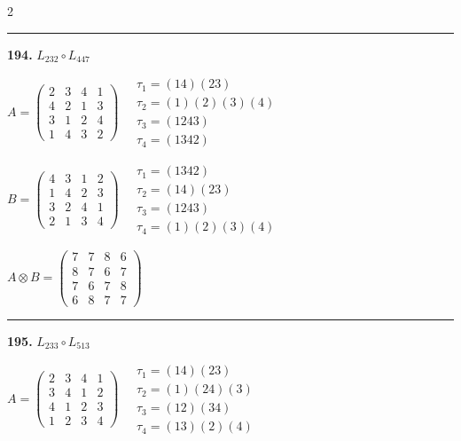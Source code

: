 \begin{multicols}{2}
\vspace{0.3em}
\hrule
\vspace{0.3em}

\noindent\textbf{194.} $L_{232} \circ L_{447}$

$A = \begin{pmatrix} 2 & 3 & 4 & 1 \\ 4 & 2 & 1 & 3 \\ 3 & 1 & 2 & 4 \\ 1 & 4 & 3 & 2 \end{pmatrix} \quad \begin{matrix} \tau_{1}=(1 4)(2 3) \\ \tau_{2}=(1)(2)(3)(4) \\ \tau_{3}=(1 2 4 3) \\ \tau_{4}=(1 3 4 2) \end{matrix}$

$B = \begin{pmatrix} 4 & 3 & 1 & 2 \\ 1 & 4 & 2 & 3 \\ 3 & 2 & 4 & 1 \\ 2 & 1 & 3 & 4 \end{pmatrix} \quad \begin{matrix} \tau_{1}=(1 3 4 2) \\ \tau_{2}=(1 4)(2 3) \\ \tau_{3}=(1 2 4 3) \\ \tau_{4}=(1)(2)(3)(4) \end{matrix}$

$A \otimes B = \begin{pmatrix} 7 & 7 & 8 & 6 \\ 8 & 7 & 6 & 7 \\ 7 & 6 & 7 & 8 \\ 6 & 8 & 7 & 7 \end{pmatrix}$

\vspace{0.3em}
\hrule
\vspace{0.3em}

\noindent\textbf{195.} $L_{233} \circ L_{513}$

$A = \begin{pmatrix} 2 & 3 & 4 & 1 \\ 3 & 4 & 1 & 2 \\ 4 & 1 & 2 & 3 \\ 1 & 2 & 3 & 4 \end{pmatrix} \quad \begin{matrix} \tau_{1}=(1 4)(2 3) \\ \tau_{2}=(1)(2 4)(3) \\ \tau_{3}=(1 2)(3 4) \\ \tau_{4}=(1 3)(2)(4) \end{matrix}$


\end{multicols}
